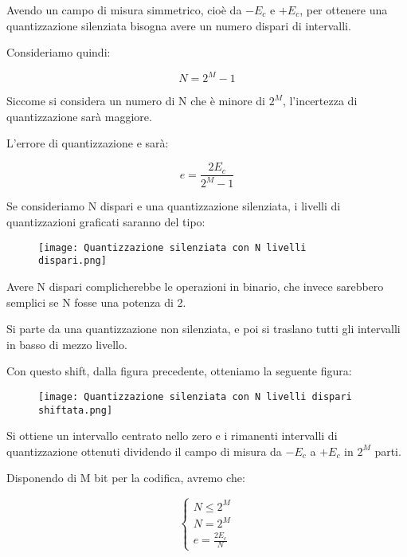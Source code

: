 Avendo un campo di misura simmetrico, cioè da $-E_c$ e $+E_c$, 
per ottenere una quantizzazione silenziata bisogna avere un numero dispari  di intervalli. \newline 

Consideriamo quindi: 

{ 
    \Large 
    \begin{equation}
        N = 2^{M} - 1
    \end{equation}
}

Siccome si considera un numero di N che è minore di $2^{M}$, 
l'incertezza di quantizzazione sarà maggiore. \newline 

L'errore di quantizzazione e sarà: 

{
    \Large 
    \begin{equation}
        e = \frac{2 E_c}{2^{M} -1}
    \end{equation}
}

Se consideriamo N dispari e una quantizzazione silenziata, 
i livelli di quantizzazioni graficati saranno del tipo: 

\begin{figure}[h]
    \centering
    \texttt{[image: Quantizzazione silenziata con N livelli dispari.png]}
\end{figure}

Avere N dispari complicherebbe le operazioni in binario, 
che invece sarebbero semplici se N fosse una potenza di 2. \newline 

Si parte da una quantizzazione non silenziata, e poi si traslano tutti gli intervalli in basso di mezzo livello. \newline 

Con questo shift, dalla figura precedente, otteniamo la seguente figura: 

\begin{figure}[h]
    \centering
    \texttt{[image: Quantizzazione silenziata con N livelli dispari shiftata.png]}
\end{figure}

\newpage 

Si ottiene un intervallo centrato nello zero e i rimanenti intervalli di quantizzazione ottenuti 
dividendo il campo di misura da $-E_c$ a $+E_c$ in $2^{M}$ parti. \newline 

Disponendo di M bit per la codifica, avremo che: 

{
    \Large 
    \begin{equation}
        \begin{cases}
            N \leq 2^{M}
            \\
            N = 2^{M} 
            \\  
            e = \frac{2 E_c}{N}
        \end{cases}
    \end{equation}
}

